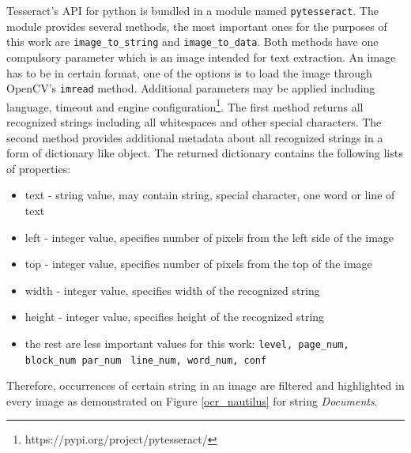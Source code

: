 Tesseract's API for python is bundled in a module named \texttt{pytesseract}. The module provides several methods, the most important ones for the purposes of this work are \verb|image_to_string| and \verb|image_to_data|. Both methods have one compulsory parameter which is an image intended for text extraction. An image has to be in certain format, one of the options is to load the image through OpenCV's \texttt{imread} method. Additional parameters may be applied including language, timeout and engine configuration\footnote{https://pypi.org/project/pytesseract/}. The first method returns all recognized strings including all whitespaces and other special characters. The second method provides additional metadata about all recognized strings in a form of dictionary like object. The returned dictionary contains the following lists of properties:

\begin{itemize}
    \item text - string value, may contain string, special character, one word or line of text
    \item left - integer value, specifies number of pixels from the left side of the image 
    \item top - integer value, specifies number of pixels from the top of the image
    \item width - integer value, specifies width of the recognized string 
    \item height - integer value, specifies height of the recognized string
    \item the rest are less important values for this work: \verb|level, page_num, block_num par_num|
    \verb| line_num, word_num, conf|
\end{itemize}

Therefore, occurrences of certain string in an image are filtered and highlighted in every image as demonstrated on Figure \ref{ocr_nautilus} for string \textit{Documents}.

